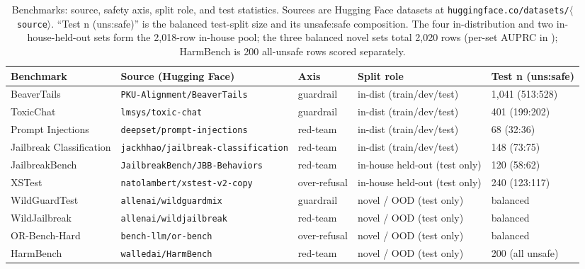 \documentclass[sigconf,nonacm]{acmart}
\begin{document}
\begin{table}[t]
\centering
\small
\caption{Benchmarks: source, safety axis, split role, and test statistics. Sources are Hugging Face datasets at \texttt{huggingface.co/datasets/$\langle$source$\rangle$}. ``Test n (uns:safe)'' is the balanced test-split size and its unsafe:safe composition. The four in-distribution and two in-house-held-out sets form the 2{,}018-row in-house pool; the three balanced novel sets total 2{,}020 rows (per-set AUPRC in ); HarmBench is 200 all-unsafe rows scored separately.}
\label{tab:benchmarks}
\begin{tabular}{lllll}
\toprule
Benchmark & Source (Hugging Face) & Axis & Split role & Test n (uns:safe) \\
\midrule
BeaverTails~\cite{ji2023beavertails} & \texttt{PKU-Alignment/BeaverTails} & guardrail & in-dist (train/dev/test) & 1{,}041 (513:528) \\
ToxicChat~\cite{lin2023toxicchat} & \texttt{lmsys/toxic-chat} & guardrail & in-dist (train/dev/test) & 401 (199:202) \\
Prompt Injections & \texttt{deepset/prompt-injections} & red-team & in-dist (train/dev/test) & 68 (32:36) \\
Jailbreak Classification & \texttt{jackhhao/jailbreak-classification} & red-team & in-dist (train/dev/test) & 148 (73:75) \\
JailbreakBench~\cite{chao2024jailbreakbench} & \texttt{JailbreakBench/JBB-Behaviors} & red-team & in-house held-out (test only) & 120 (58:62) \\
XSTest~\cite{rottger2024xstest} & \texttt{natolambert/xstest-v2-copy} & over-refusal & in-house held-out (test only) & 240 (123:117) \\
\midrule
WildGuardTest~\cite{han2024wildguard} & \texttt{allenai/wildguardmix} & guardrail & novel / OOD (test only) & balanced \\
WildJailbreak~\cite{jiang2024wildteaming} & \texttt{allenai/wildjailbreak} & red-team & novel / OOD (test only) & balanced \\
OR-Bench-Hard~\cite{cui2024orbench} & \texttt{bench-llm/or-bench} & over-refusal & novel / OOD (test only) & balanced \\
HarmBench~\cite{mazeika2024harmbench} & \texttt{walledai/HarmBench} & red-team & novel / OOD (test only) & 200 (all unsafe) \\
\bottomrule
\end{tabular}
\end{table}
\end{document}
